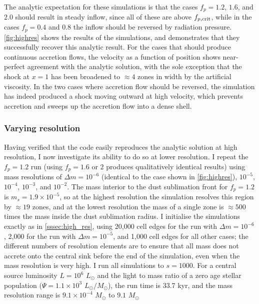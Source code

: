 \documentclass[useAMS,usenatbib]{mn2e}
\begin{document}
The analytic expectation for these simulations is that the cases $f_p = 1.2$, $1.6$, and $2.0$ should result in steady inflow, since all of these are above $f_{p,\rm crit}$, while in the cases $f_p = 0.4$ and 0.8 the inflow should be reversed by radiation pressure. \autoref{fig:highres} shows the results of the simulations, and demonstrates that they successfully recover this analytic result. For the cases that should produce continuous accretion flows, the velocity as a function of position shows near-perfect agreement with the analytic solution, with the sole exception that the shock at $x=1$ has been broadened to $\approx 4$ zones in width by the artificial viscosity. In the two cases where accretion flow should be reversed, the simulation has indeed produced a shock moving outward at high velocity, which prevents accretion and sweeps up the accretion flow into a dense shell.

\subsubsection{Varying resolution}

Having verified that the code easily reproduces the analytic solution at high resolution, I now investigate its ability to do so at lower resolution. I repeat the $f_p = 1.2$ run (using $f_p = 1.6$ or $2$ produces qualitatively identical results) using mass resolutions of $\Delta m = 10^{-6}$ (identical to the case shown in \autoref{fig:highres}), $10^{-5}$, $10^{-4}$, $10^{-3}$, and $10^{-2}$. The mass interior to the dust sublimation front for $f_p=1.2$ is $m_s = 1.9\times 10^{-5}$, so at the highest resolution the simulation resolves this region by $\approx 19$ zones, and at the lowest resolution the mass of a single zone is $\approx 500$ times the mass inside the dust sublimation radius. I initialise the simulations exactly as in \autoref{sssec:high_res}, using 20,000 cell edges for the run with $\Delta m = 10^{-6}$, 2,000 for the run with $\Delta m = 10^{-5}$, and 1,000 cell edges for all other cases; the different numbers of resolution elements are to ensure that all mass does not accrete onto the central sink before the end of the simulation, even when the mass resolution is very high. I run all simulations to $s=1000$. For a central source luminosity $L = 10^6$ $L_\odot$ and the light to mass ratio of a zero age stellar population ($\Psi = 1.1\times 10^3$ $L_\odot/M_\odot$), the run time is 33.7 kyr, and the mass resolution range is $9.1\times 10^{-4}$ $M_\odot$ to $9.1$ $M_\odot$
\end{document}
